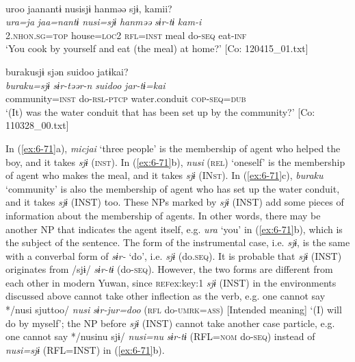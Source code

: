 \ex{}\\
{\TM}
\glll  uroo  jaanantɨ  nusisjɨ  hanməə  sjɨ,  kamii?\\
\textit{ura=ja}  \textit{jaa=nantɨ}  \textit{nusi=sjɨ}  \textit{hanməə}  \textit{sɨr-tɨ}  \textit{kam-i}\\
2.\textsc{nhon}.\textsc{sg}=\textsc{top}  house=\textsc{loc2}  \textsc{rfl}=\textsc{inst}  meal  do-\textsc{seq}  eat-\textsc{inf}\\
\glt ‘You cook by yourself and eat (the meal) at home?’ [Co: 120415\_01.txt]
\z

\ex {\TM}  burakusjɨ  sjən  {\textbar}suidoo{\textbar}  jatɨkai?\\
\glll \textit{buraku=sjɨ}  \textit{sɨr-təər-n}  \textit{suidoo}  \textit{jar-tɨ=kai}\\
community=\textsc{inst}  do-\textsc{rsl}-\textsc{ptcp}  water.conduit  \textsc{cop}-\textsc{seq}=\textsc{dub}\\
\glt ‘(It) was the water conduit that has been set up by the community?’ [Co: 110328\_00.txt]
\z

In (\ref{ex:6-71}a), \textit{micjai} ‘three people’ is the membership of agent who helped the boy, and it takes \textit{sjɨ} (\textsc{inst}). In (\ref{ex:6-71}b), \textit{nusi} (\textsc{rel}) ‘oneself’ is the membership of agent who makes the meal, and it takes \textit{sjɨ} (IN\textsc{st}). In (\ref{ex:6-71}c), \textit{buraku} ‘community’ is also the membership of agent who has set up the water conduit, and it takes \textit{sjɨ} (INST) too. These NPs marked by \textit{sjɨ} (INST) add some pieces of information about the membership of agents. In other words, there may be another NP that indicates the agent itself, e.g. \textit{ura} ‘you’ in (\ref{ex:6-71}b), which is the subject of the sentence. The form of the instrumental case, i.e. \textit{sjɨ}, is the same with a converbal form of \textit{sɨr-} ‘do’, i.e. \textit{sjɨ} (do.\textsc{seq}). It is probable that \textit{sjɨ} (INST) originates from /sjɨ/ \textit{sɨr-tɨ} (do-\textsc{seq}). However, the two forms are different from each other in modern Yuwan, since \textsc{ref}{ex:key:1} \textit{sjɨ} (INST) in the environments discussed above cannot take other inflection as the verb, e.g. one cannot say */nusi sjuttoo/ \textit{nusi} \textit{sɨr-jur=doo} (\textsc{rfl} do-\textsc{umrk}=\textsc{ass}) [Intended meaning] ‘(I) will do by myself’;  the NP before \textit{sjɨ} (INST) cannot take another case particle, e.g. one cannot say */nusinu sjɨ/ \textit{nusi=nu} \textit{sɨr-tɨ} (RFL=\textsc{nom} do-\textsc{seq}) instead of \textit{nusi=sjɨ} (RFL=INST) in (\ref{ex:6-71}b).

